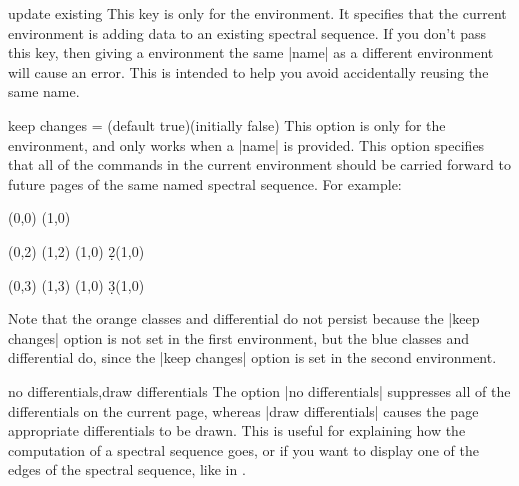 \begin{sseqdata}[|| name = ex1, cohomological Serre grading]
\begin{key}{update existing}
This key is only for the \sseqdataenv\space environment. It specifies that the current \sseqdataenv\space environment is adding data to an existing spectral sequence. If you don't pass this key, then giving a \sseqdataenv\space environment the same |name| as a different \sseqdataenv\space environment will cause an error. This is intended to help you avoid accidentally reusing the same name.
\end{key}


\begin{key}{keep changes = (default true)(initially false)}
This option is only for the \sseqpageenv\space environment, and only works when a |name| is provided.
This option specifies that all of the commands in the current \sseqpageenv\space environment should be carried forward to future pages of the same named spectral sequence. For example:
\begin{codeexample}[]
\begin{sseqdata}[ name = keep changes example, Adams grading, y range = {0}{3} ]
\class(0,0)
\class(1,0)
\end{sseqdata}

\begin{sseqpage}[ name = keep changes example, sseq = orange ]
\class(0,2)
\class(1,2)
\classoptions[orange](1,0)
\d2(1,0)
\end{sseqpage} \qquad

\printpage[ name = keep changes example, page = 2 ] \qquad

\begin{sseqpage}[ name = keep changes example, sseq = blue, keep changes ]
\class(0,3)
\class(1,3)
\classoptions[blue](1,0)
\d3(1,0)
\end{sseqpage} \qquad

\printpage[ name = keep changes example, page = 3 ]
\end{codeexample}
Note that the orange classes and differential do not persist because the |keep changes| option is not set in the first \sseqpageenv\space environment, but the blue classes and differential do, since the |keep changes| option is set in the second \sseqpageenv\space environment.
\end{key}


\begin{keylist}{no differentials,draw differentials}
The option |no differentials| suppresses all of the differentials on the current page, whereas |draw differentials| causes the page appropriate differentials to be drawn. This is useful for explaining how the computation of a spectral sequence goes, or if you want to display one of the edges of the spectral sequence, like in .
\end{keylist}


\end{sseqdata}
